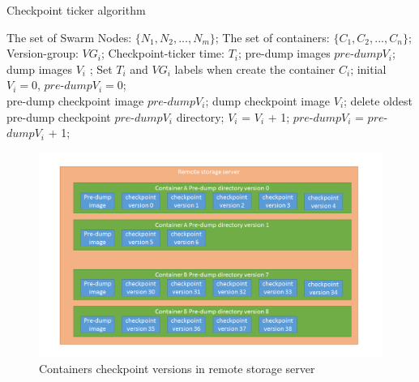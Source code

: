 \begin{algorithm}[h]
    \caption{Checkpoint ticker algorithm}
    \label{code:checkpointTicker}
    \begin{algorithmic}[1]
	\Require
		The set of Swarm Nodes: $\lbrace N_1,N_2,...,N_m \rbrace $;
		The set of containers: $\lbrace C_1,C_2,...,C_n \rbrace$;
		Version-group: $ VG_i $;
		Checkpoint-ticker time: $ T_i $;
	\Ensure
		pre-dump images $ pre$-$dump V_i $; dump images $ V_i $ ;
        \State Set $ T_i $ and $ VG_i $ labels when create the container $ C_i $;
        \State initial $ V_i=0 $, $ pre$-$dump V_i=0 $;
        \\
					\State pre-dump checkpoint image $ pre $-$ dump V_i $;
				\EndIf
			\State dump checkpoint image $ V_i $;
                	\State delete oldest pre-dump checkpoint $ pre $-$ dump V_i $ directory;
				\EndIf
            	\State $ V_i $ = $ V_ i$ + 1;
          	      \State $ pre $-$ dump V_i $ = $ pre $-$ dump V_i $ + 1;
        	    \EndIf
     	   \EndWhile
        \EndFor
    \end{algorithmic}
\end{algorithm}

\begin{figure}[h]
\begin{center}
\includegraphics[width=15cm]{figure/checkpoint_demo.png}
\end{center}
\caption{Containers checkpoint versions in remote storage server}
\label{fig:Containers checkpoint versions in remote storage server}
\end{figure}


